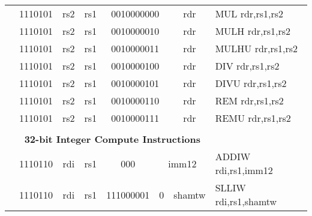 \begin{table}[p]
\begin{small}
\begin{center}
\begin{tabular}{rcccccccccccl}
&
\multicolumn{2}{|c|}{1110101} &
\multicolumn{1}{c|}{rs2} &
\multicolumn{1}{c|}{rs1} &
\multicolumn{6}{c|}{0010000000} &
\multicolumn{1}{c|}{rdr} & MUL rdr,rs1,rs2 \\
\cline{2-12}
  

&
\multicolumn{2}{|c|}{1110101} &
\multicolumn{1}{c|}{rs2} &
\multicolumn{1}{c|}{rs1} &
\multicolumn{6}{c|}{0010000010} &
\multicolumn{1}{c|}{rdr} & MULH rdr,rs1,rs2 \\
\cline{2-12}
  

&
\multicolumn{2}{|c|}{1110101} &
\multicolumn{1}{c|}{rs2} &
\multicolumn{1}{c|}{rs1} &
\multicolumn{6}{c|}{0010000011} &
\multicolumn{1}{c|}{rdr} & MULHU rdr,rs1,rs2 \\
\cline{2-12}
  

&
\multicolumn{2}{|c|}{1110101} &
\multicolumn{1}{c|}{rs2} &
\multicolumn{1}{c|}{rs1} &
\multicolumn{6}{c|}{0010000100} &
\multicolumn{1}{c|}{rdr} & DIV rdr,rs1,rs2 \\
\cline{2-12}
  

&
\multicolumn{2}{|c|}{1110101} &
\multicolumn{1}{c|}{rs2} &
\multicolumn{1}{c|}{rs1} &
\multicolumn{6}{c|}{0010000101} &
\multicolumn{1}{c|}{rdr} & DIVU rdr,rs1,rs2 \\
\cline{2-12}
  

&
\multicolumn{2}{|c|}{1110101} &
\multicolumn{1}{c|}{rs2} &
\multicolumn{1}{c|}{rs1} &
\multicolumn{6}{c|}{0010000110} &
\multicolumn{1}{c|}{rdr} & REM rdr,rs1,rs2 \\
\cline{2-12}
  

&
\multicolumn{2}{|c|}{1110101} &
\multicolumn{1}{c|}{rs2} &
\multicolumn{1}{c|}{rs1} &
\multicolumn{6}{c|}{0010000111} &
\multicolumn{1}{c|}{rdr} & REMU rdr,rs1,rs2 \\
\cline{2-12}
  

&
\multicolumn{11}{c}{} & \\
&
\multicolumn{11}{c}{\bf 32-bit Integer Compute Instructions} & \\
\cline{2-12}
  

&
\multicolumn{2}{|c|}{1110110} &
\multicolumn{1}{c|}{rdi} &
\multicolumn{1}{c|}{rs1} &
\multicolumn{2}{c|}{000} &
\multicolumn{5}{c|}{imm12} & ADDIW rdi,rs1,imm12 \\
\cline{2-12}
  

&
\multicolumn{2}{|c|}{1110110} &
\multicolumn{1}{c|}{rdi} &
\multicolumn{1}{c|}{rs1} &
\multicolumn{5}{c|}{111000001} &
\multicolumn{1}{c|}{0} &
\multicolumn{1}{c|}{shamtw} & SLLIW rdi,rs1,shamtw \\
\cline{2-12}
  


\end{tabular}
\end{center}
\end{small}
\end{table}

